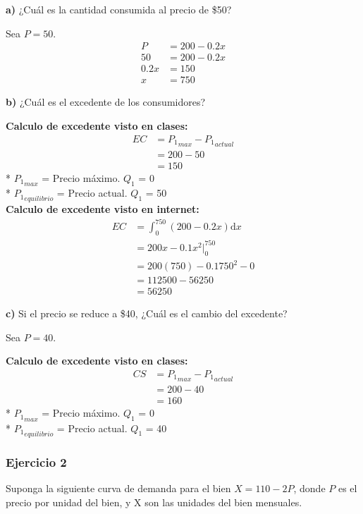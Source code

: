 \documentclass{templateNote}
\begin{document}
\textbf{a)} ¿Cuál es la cantidad consumida al precio de \$50?

Sea $P = 50$.
\begin{align*}
    P &= 200 -0.2x \\
    50 &= 200 -0.2x \\
    0.2x &= 150 \\
    x &= 750
\end{align*}

\textbf{b)} ¿Cuál es el excedente de los consumidores?

\textbf{Calculo de excedente visto en clases:}
\begin{align*}
    EC &= {P_1}_{max} - {P_1}_{actual} \\
    &= 200 -50 \\
    &= 150
\end{align*}
* ${P_1}_{max}$ = Precio máximo. $Q_1$ = 0\\
* ${P_1}_{equilibrio}$ = Precio actual. $Q_1$ = 50\\ 

\textbf{Calculo de excedente visto en internet:}
\begin{align*}
    EC &= \int_{0}^{750} (200 -0.2x) \mathrm{d}x \\
    &= 200x -0.1 {x}^2 \Big|_{0}^{750} \\
    &= 200(750) -0.1 {750}^2 - 0 \\
    &= 112500 - 56250 \\
    &= 56250
\end{align*}

\textbf{c)} Si el precio se reduce a \$40, ¿Cuál es el cambio del excedente?

Sea $P = 40$.

\textbf{Calculo de excedente visto en clases:}
\begin{align*}
    CS &= {P_1}_{max} - {P_1}_{actual} \\
    &= 200 -40 \\
    &= 160
\end{align*}
* ${P_1}_{max}$ = Precio máximo. $Q_1$ = 0\\
* ${P_1}_{equilibrio}$ = Precio actual. $Q_1$ = 40\\

\newpage
\subsubsection{Ejercicio 2}
Suponga la siguiente curva de demanda para el bien $X = 110 - 2P$, donde $P$ es el precio
por unidad del bien, y X son las unidades del bien mensuales.
\end{document}
